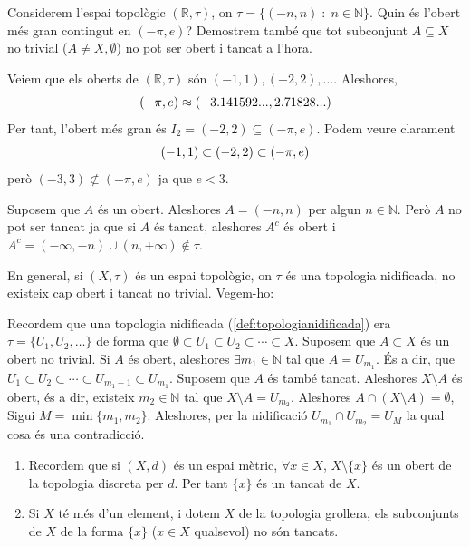 \documentclass[../main.tex]{subfiles}
\begin{document}
\begin{ej}
\label{ej:obertsitancats6} Considerem l'espai topològic $(\mathbb{R},\tau)$, on $\tau = \{(-n,n)\;:\;n\in\mathbb{N}\}$. Quin és l'obert més gran contingut en $(-\pi,e)$? Demostrem també que tot subconjunt $A\subseteq X$ no trivial ($A\not=X,\emptyset$) no pot ser obert i tancat a l'hora.

Veiem que els oberts de $(\mathbb{R},\tau)$ són $(-1,1),(-2,2),\ldots$. Aleshores,
\begin{equation}
    \notag
    (-\pi,e)\approx (-3.141592..., 2.71828...)
\end{equation}
Per tant, l'obert més gran és $I_2 = (-2,2)\subseteq (-\pi,e)$. Podem veure clarament
\begin{equation}
    \notag
    (-1,1)\subset(-2,2)\subset(-\pi,e)
\end{equation}
però $(-3,3)\not\subset(-\pi,e)$ ja que $e<3$.

Suposem que $A$ és un obert. Aleshores $A = (-n,n)$ per algun $n\in\mathbb{N}$. Però $A$ no pot ser tancat ja que si $A$ és tancat, aleshores $A^c$ és obert i $A^c = (-\infty,-n)\cup (n,+\infty)\not\in\tau$.
\end{ej}

\begin{ej}
\label{ej:obertsitancats7} En general, si $(X,\tau)$ és un espai topològic, on $\tau$ és una topologia nidificada, no existeix cap obert i tancat no trivial. Vegem-ho:

Recordem que una topologia nidificada (\ref{def:topologianidificada}) era $\tau = \{U_1,U_2,\ldots\}$ de forma que $\emptyset\subset U_1\subset U_2\subset\cdots\subset X$. Suposem que $A\subset X$ és un obert no trivial. Si $A$ és obert, aleshores $\exists m_1\in\mathbb{N}$ tal que $A = U_{m_1}$. És a dir, que $U_1\subset U_2\subset\cdots\subset U_{m_1-1}\subset U_{m_1}$. Suposem que $A$ és també tancat. Aleshores $X\setminus A$ és obert, és a dir, existeix $m_2\in\mathbb{N}$ tal que $X\setminus A = U_{m_2}$. Aleshores $A\cap (X\setminus A) = \emptyset$, Sigui $M = \min\{m_1,m_2\}$. Aleshores, per la nidificació $U_{m_1}\cap U_{m_2} = U_M$ la qual cosa és una contradicció.
\end{ej}

\begin{ej}
\begin{enumerate}[(1)]
    \item Recordem que si $(X,d)$ és un espai mètric, $\forall x\in X$, $X\setminus\{x\}$ és un obert de la topologia discreta per $d$. Per tant $\{x\}$ és un tancat de $X$.
    \item Si $X$ té més d'un element, i dotem $X$ de la topologia grollera, els subconjunts de $X$ de la forma $\{x\}$ ($x\in X$ qualsevol) no són tancats.
\end{enumerate}
\end{ej}
\end{document}
